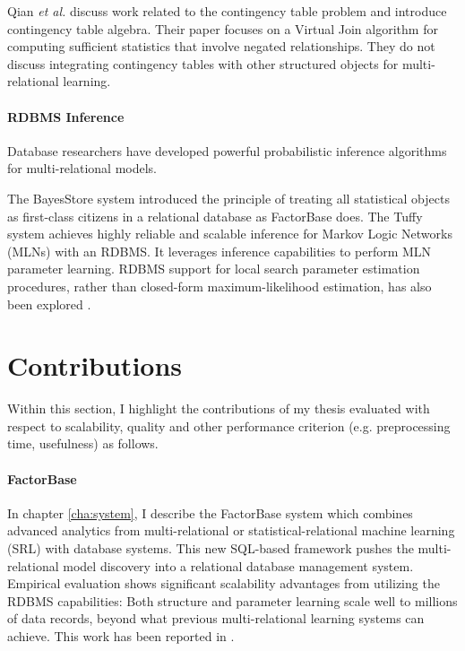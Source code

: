 \documentclass{sfuthesis}
\begin{document}
Qian {\em et al.} \cite{Qian2014a}  discuss work related to the contingency table problem and introduce contingency table algebra. Their paper focuses on a Virtual Join algorithm for computing sufficient statistics that involve negated relationships. They do not discuss integrating contingency tables with other structured objects for multi-relational learning. 
%

\paragraph{RDBMS Inference} 
Database researchers have developed powerful probabilistic inference  algorithms for multi-relational models. 

 The BayesStore system \cite{Wang2008} introduced the principle of treating all statistical objects as first-class citizens in a relational database as FactorBase  does. The Tuffy system \cite{Niu2011} achieves highly reliable and scalable inference for Markov Logic Networks (MLNs) with an RDBMS. It leverages inference capabilities to perform MLN parameter learning. RDBMS support for local search parameter estimation procedures, rather than closed-form maximum-likelihood estimation, has also been explored \cite{Feng_SIGMOD_2012,Niu2011,Niu2011a}.


\section{Contributions}
Within this section, I highlight  the contributions of my thesis evaluated with respect to scalability, quality and other performance criterion (e.g. preprocessing time, usefulness) as follows.

\paragraph {FactorBase} In chapter \ref{cha:system}, I describe the FactorBase system which combines advanced analytics from multi-relational or statistical-relational machine learning (SRL) with database systems. This new SQL-based framework pushes the multi-relational model discovery into a relational database management system.  Empirical evaluation shows significant scalability advantages from utilizing the RDBMS capabilities: Both structure and parameter learning scale well to millions of data records, beyond what previous multi-relational learning systems can achieve.  This work has been reported in \cite{Qian2015, Zhensong2015}.
\end{document}
